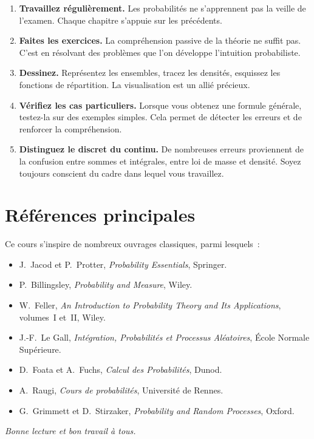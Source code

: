 \begin{enumerate}
    \item \textbf{Travaillez r\'eguli\`erement.} Les probabilit\'es ne s'apprennent pas
    la veille de l'examen. Chaque chapitre s'appuie sur les pr\'ec\'edents.

    \item \textbf{Faites les exercices.} La compr\'ehension passive de la th\'eorie ne
    suffit pas. C'est en r\'esolvant des probl\`emes que l'on d\'eveloppe l'intuition
    probabiliste.

    \item \textbf{Dessinez.} Repr\'esentez les ensembles, tracez les densit\'es, esquissez
    les fonctions de r\'epartition. La visualisation est un alli\'e pr\'ecieux.

    \item \textbf{V\'erifiez les cas particuliers.} Lorsque vous obtenez une formule
    g\'en\'erale, testez-la sur des exemples simples. Cela permet de d\'etecter les erreurs
    et de renforcer la compr\'ehension.

    \item \textbf{Distinguez le discret du continu.} De nombreuses erreurs proviennent
    de la confusion entre sommes et int\'egrales, entre loi de masse et densit\'e. Soyez
    toujours conscient du cadre dans lequel vous travaillez.
\end{enumerate}

\section*{R\'ef\'erences principales}

Ce cours s'inspire de nombreux ouvrages classiques, parmi lesquels~:
\begin{itemize}
    \item J.~Jacod et P.~Protter, \textit{Probability Essentials}, Springer.
    \item P.~Billingsley, \textit{Probability and Measure}, Wiley.
    \item W.~Feller, \textit{An Introduction to Probability Theory and Its Applications},
          volumes~I et~II, Wiley.
    \item J.-F.~Le Gall, \textit{Int\'egration, Probabilit\'es et Processus Al\'eatoires},
          \'Ecole Normale Sup\'erieure.
    \item D.~Foata et A.~Fuchs, \textit{Calcul des Probabilit\'es}, Dunod.
    \item A.~Raugi, \textit{Cours de probabilit\'es}, Universit\'e de Rennes.
    \item G.~Grimmett et D.~Stirzaker, \textit{Probability and Random Processes}, Oxford.
\end{itemize}

\bigskip

\hfill\textit{Bonne lecture et bon travail \`a tous.}
